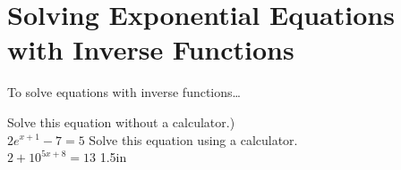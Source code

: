 \section{Solving Exponential Equations with Inverse Functions}

\begin{myConceptSteps}{To solve equations with inverse functions\dots}
\end{myConceptSteps}

\myProblems
{
    Solve this equation without a calculator.)\\[0.5\onelineskip]
    $ 2 e^{x+1} - 7 = 5 $
}
{
    Solve this equation using a calculator.\\[0.5\onelineskip]
    $ 2 + 10^{5x+8} = 13 $
}
{1.5in}
